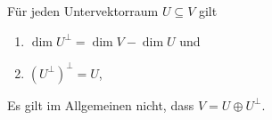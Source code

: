 \begin{lemma}
  Für jeden Untervektorraum $U \subseteq V$ gilt
  \begin{enumerate}
    \item
      $\dim U^\perp = \dim V - \dim U$ und
    \item
      $(U^\perp)^\perp = U$,
  \end{enumerate}
\end{lemma}

\begin{warning}
  Es gilt im Allgemeinen nicht, dass $V = U \oplus U^\perp$.
\end{warning}




